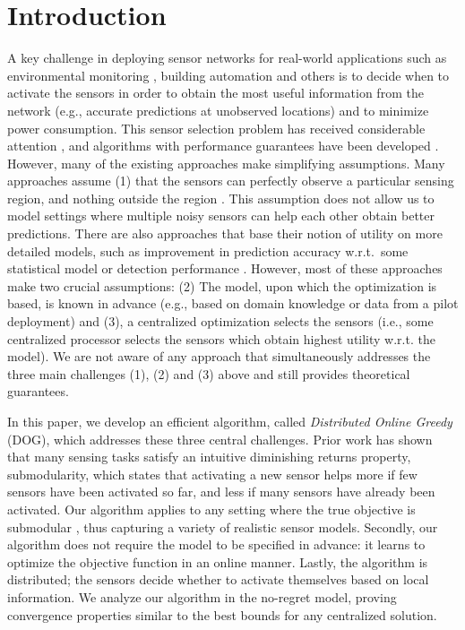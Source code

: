 \documentclass{sig-alternate-dan}
\numberwithin{equation}{section}
\newcommand{\algofont}[1]{\textsc{#1}}
\newcommand{\algoname}{{\algofont{DOG}}\xspace}
\begin{document}
%
%
%
%


%

\section{Introduction}
\label{sec:intro}

A key challenge in deploying sensor networks for real-world
applications such as environmental monitoring \cite{krause07jmlr},
building automation \cite{singhvi05intelligent} and others is to
decide when to activate the sensors in order to obtain the most useful
information from the network (e.g., accurate predictions at unobserved
locations) and to minimize power consumption. This sensor selection
problem has received considerable attention
\cite{abrams04set,zhao02IDSQ,vldb04}, and algorithms with performance
guarantees have been developed \cite{abrams04set,krause05near}.
However, many of the existing approaches make simplifying
assumptions. Many approaches assume (1) that the sensors can perfectly
observe a particular sensing region, and nothing outside the region
\cite{abrams04set}.  This assumption does not allow us to model
settings where multiple noisy sensors can help each other obtain
better predictions.  There are also approaches that base their notion
of utility on more detailed models, such as improvement in prediction
accuracy w.r.t.~some statistical model \cite{vldb04} or detection
performance \cite{krause08efficient}.  However, most of these
approaches make two crucial assumptions: (2) The model, upon which the
optimization is based, is known in advance (e.g., based on domain
knowledge or data from a pilot deployment) and (3), a centralized
optimization selects the sensors (i.e., some centralized processor
selects the sensors which obtain highest utility w.r.t. the model).
We are not aware of any approach that simultaneously addresses the
three main challenges (1), (2) and (3) above and still provides
theoretical guarantees.

In this paper, we develop an efficient algorithm, called
\emph{Distributed Online Greedy} (\algoname), which addresses these
three central challenges.  Prior work \cite{krause07nearoptimal} has
shown that many sensing tasks satisfy an intuitive diminishing returns
property, submodularity, which states that activating a new sensor
helps more if few sensors have been activated so far, and less if many
sensors have already been activated.  Our algorithm applies to any
setting where the true objective is submodular \cite{nemhauser78},
thus capturing a variety of realistic sensor models. Secondly, our
algorithm does not require the model to be specified in advance: it
learns to optimize the objective function in an online manner.
Lastly, the algorithm is distributed; the sensors decide whether to
activate themselves based on local information.  We analyze our
algorithm in the no-regret model, proving convergence properties
similar to the best bounds for any centralized solution.
\end{document}
